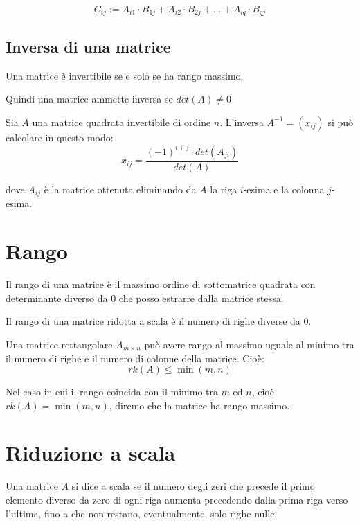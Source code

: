 $$C_{ij} := A_{i1} \cdot B_{1j} + A_{i2} \cdot B_{2j} + \ldots + A_{iq} \cdot B_{qj}$$

\subsection{Inversa di una matrice}

\begin{theorem}
Una matrice è invertibile se e solo se ha rango massimo.
\end{theorem}

Quindi una matrice ammette inversa se $det(A) \neq 0$

\begin{theorem}
Sia $A$ una matrice quadrata invertibile di ordine $n$. L'inversa $A^{-1}=(x_{ij})$ si può calcolare in questo modo:
$$ x_{ij} = \frac{(-1)^{i+j}\cdot det(A_{ji})}{det(A)}$$

dove $A_{ij}$ è la matrice ottenuta eliminando da $A$ la riga $i$-esima e la colonna $j$-esima.
\end{theorem}

\section{Rango}

\begin{definition}
Il rango di una matrice è il massimo ordine di sottomatrice quadrata con determinante diverso da 0 che posso estrarre dalla matrice stessa.
\end{definition}

\begin{definition}
Il rango di una matrice ridotta a scala è il numero di righe diverse da 0.
\end{definition}

Una matrice rettangolare $A_{m \times n}$ può avere rango al massimo uguale al minimo tra il numero di righe e il numero di colonne della matrice. Cioè:
$$rk(A)\leq \min(m,n)$$

Nel caso in cui il rango coincida con il minimo tra $m$ ed $n$, cioè $rk(A)= \min(m,n)$, diremo che la matrice ha rango massimo.

\section{Riduzione a scala}

\begin{definition}
Una matrice $A$ si dice a scala se il numero degli zeri che precede il primo elemento diverso da zero di ogni riga aumenta precedendo dalla prima riga verso l'ultima, fino a che non restano, eventualmente, solo righe nulle.
\end{definition}

